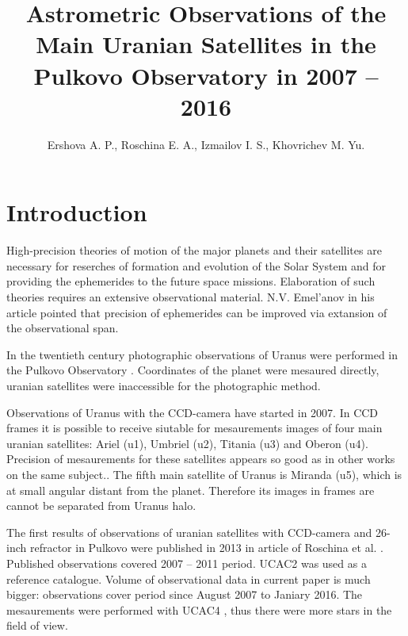 \documentclass[]{article}
\title{Astrometric Observations of the Main Uranian Satellites in the Pulkovo Observatory in 2007 -- 2016}
\author{Ershova A. P., Roschina E. A., Izmailov I. S., Khovrichev M. Yu.}
\begin{document}
\maketitle

\begin{abstract}

\end{abstract}

\section{Introduction}
High-precision theories of motion of the major planets and their satellites  are necessary for reserches of formation and evolution of the Solar System and for providing the ephemerides to the future space missions. Elaboration of such theories requires an extensive observational material. N.V. Emel'anov in his article \cite{4} pointed that precision of ephemerides can be improved via extansion of the observational span.\par

In the twentieth century photographic observations of Uranus were performed in the Pulkovo Observatory \cite{8}. Coordinates of the planet were mesaured directly, uranian satellites were inaccessible for the photographic method.\par

Observations of Uranus with the CCD-camera have started in 2007. In CCD frames it is possible to receive siutable for mesaurements images of four main uranian satellites: Ariel (u1), Umbriel (u2), Titania (u3) and Oberon (u4). Precision of mesaurements for these satellites appears so good as in other works on the same subject.\cite{2, 7}. The fifth main satellite of Uranus is Miranda (u5), which is at small angular distant from the planet. Therefore its images in frames are cannot be separated from Uranus halo.\par

The first results of observations of uranian satellites with CCD-camera and 26-inch refractor in Pulkovo were published in 2013 in article of Roschina et al. \cite{1}. Published observations covered 2007 -- 2011 period. UCAC2 was used as a reference catalogue. Volume of observational data in current paper is much bigger: observations cover period since August 2007 to Janiary 2016. The mesaurements were performed with UCAC4 \cite{9}, thus there were more stars in the field of view.
\end{document}
